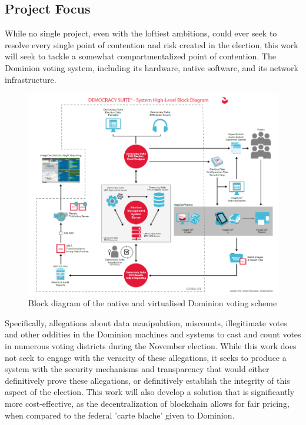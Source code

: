 \documentclass{article}
\begin{document}
\subsection{Project Focus}
While no single project, even with the loftiest ambitions, could ever seek to resolve every single point of contention and risk created in the election, this work will seek to tackle a somewhat compartmentalized point of contention. The Dominion voting system, including its hardware, native software, and its network infrastructure.
\smallbreak \noindent
\begin{figure}[ht!]
    \centering
    \includegraphics[width=\textwidth]{dominion.PNG}
    \caption{Block diagram of the native and virtualised Dominion voting scheme\cite{franklin2012interpreting}}
\end{figure}
\smallbreak \noindent
Specifically, allegations about data manipulation, miscounts, illegitimate votes and other oddities in the Dominion machines and systems to cast and count votes in numerous voting districts during the November election. While this work does not seek to engage with the veracity of these allegations, it seeks to produce a system with the security mechanisms and transparency that would either definitively prove these allegations, or definitively establish the integrity of this aspect of the election. This work will also develop a solution that is significantly more cost-effective, as the decentralization of blockchain allows for fair pricing, when compared to the federal 'carte blache' given to Dominion.\cite{murdockmulti}
\end{document}

